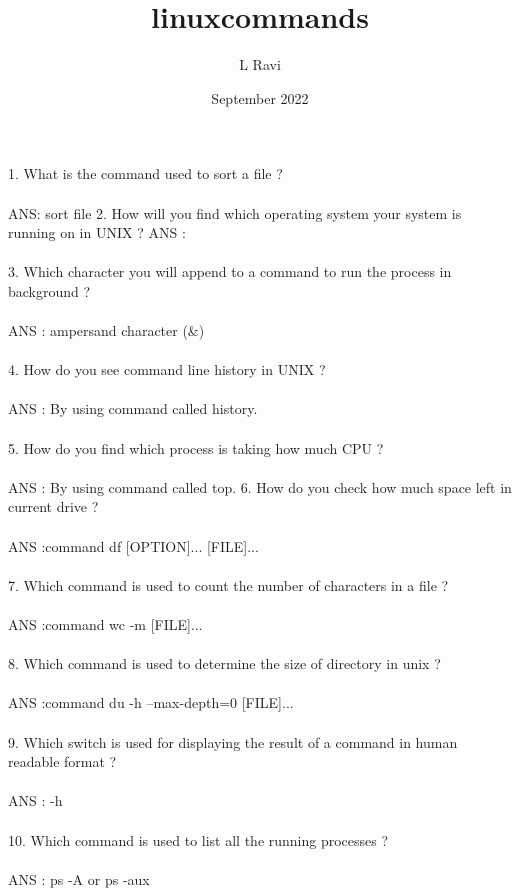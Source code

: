 \documentclass{article}
\title{linuxcommands}
\author{L Ravi }
\date{September 2022}
\begin{document}
\maketitle

1. What is the command used to sort a file ? \\ \\
ANS: sort file
2. How will you find which operating system your system is running on in UNIX ?
ANS : \\ \\
3. Which character you will append to a command to run the process in background ? \\ \\
ANS : ampersand character (\&) 
\\ \\
4. How do you see command line history in UNIX ? \\ \\
ANS : By using command called history. \\ \\
5. How do you find which process is taking how much CPU ? \\ \\
ANS : By using command called top.
6. How do you check how much space left in current drive ? \\ \\
ANS :command  df [OPTION]... [FILE]...
\\ \\
7. Which command is used to count the number of characters in a file ? \\ \\ 
ANS :command  wc -m [FILE]... \\ \\ 
8. Which command is used to determine the size of directory in unix ?\\ \\ 
ANS :command  du -h --max-depth=0 [FILE]...  \\ \\ 
9. Which switch is used for displaying the result of a command in human readable format ? \\ \\ 
ANS : -h \\ \\ 
10. Which command is used to list all the running processes ?
\\ \\
ANS : ps -A or ps -aux\\ \\ 
\end{document}

